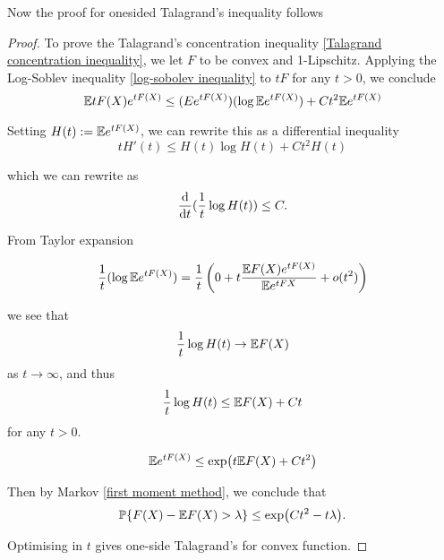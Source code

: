 Now the proof for onesided Talagrand's inequality follows
\begin{proof}
    To prove the Talagrand's concentration inequality \ref{Talagrand concentration inequality}, we let $F$ to be convex and 1-Lipschitz. Applying the Log-Soblev inequality \ref{log-sobolev inequality} to $tF$ for any $t>0$, we conclude 
    \begin{equation*}
        \mathbb{E} tF(X) e^{tF(X)} \leq (E e^{tF(X)}) (\log \mathbb{E} e^{tF(X)}) +C t^2\mathbb{E} e^{tF(X)}
    \end{equation*}
    
    Setting $H(t) := \mathbb{E} e^{tF(X)}$, we can rewrite this as a differential inequality 
    \begin{equation*}
        tH'(t)\leq H(t)\log H(t) +Ct^2 H(t)
    \end{equation*}
    
    which we can rewrite as 
    \begin{equation*}
        \frac{\mathrm{d}}{\mathrm{d} t} (\frac{1}{t}\log H(t)) \leq C.
    \end{equation*}
    
    From Taylor expansion
    
    \begin{equation*}
        \frac{1}{t}( \log \mathbb{E} e^{tF(X)} )= \frac{1}{t}\left(0+t\frac{\mathbb{E} F(X)e^{tF(X)}}{\mathbb{E} e^{tF{X}}}+o(t^2)\right)
    \end{equation*}
    
    we see that 
    \begin{equation*}
        \frac{1}{t} \log H(t) \to \mathbb{E} F(X)
    \end{equation*}
    as $t\to \infty$, and thus 
    \begin{equation*}
        \frac{1}{t} \log H(t) \leq \mathbb{E} F(X) +Ct
    \end{equation*}
    for any $t>0$.
    
    \begin{equation*}
        \mathbb{E} e^{tF(X)} \leq \exp(t\mathbb{E} F(X)+Ct^2)
    \end{equation*}
    
    Then by Markov \ref{first moment method}, we conclude that 
    \begin{equation*}
        \mathbb{P}\{F(X)-\mathbb{E} F(X)>\lambda \}\leq \exp(Ct^2-t\lambda).
    \end{equation*}
    
    Optimising in $t$ gives one-side Talagrand's for convex function.
\end{proof}


